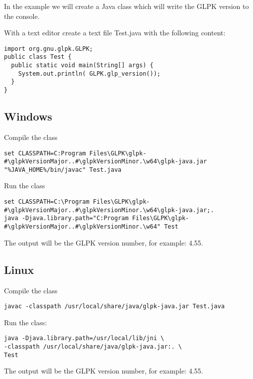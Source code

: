 \documentclass[a4paper,11pt]{report}
\newcommand{\glpkVersionMajor}{4}
\newcommand{\glpkVersionMinor}{55}
\begin{document}
In the example we will create a Java class which will write the GLPK version to the console.

With a text editor create a text file Test.java with the following content:

\begin{lstlisting}
import org.gnu.glpk.GLPK;
public class Test {
  public static void main(String[] args) {
    System.out.println( GLPK.glp_version());
  }
}
\end{lstlisting}

\subsection{Windows}

Compile the class

\begin{lstlisting}
set CLASSPATH=C:Program Files\GLPK\glpk-#\glpkVersionMajor..#\glpkVersionMinor.\w64\glpk-java.jar
"%JAVA_HOME%/bin/javac" Test.java
\end{lstlisting}

Run the class

\begin{lstlisting}
set CLASSPATH=C:\Program Files\GLPK\glpk-#\glpkVersionMajor..#\glpkVersionMinor.\w64\glpk-java.jar;.
java -Djava.library.path="C:Program Files\GLPK\glpk-#\glpkVersionMajor..#\glpkVersionMinor.\w64" Test
\end{lstlisting}

The output will be the GLPK version number, for example: \glpkVersionMajor.\glpkVersionMinor.

\subsection{Linux}
Compile the class

\begin{lstlisting}
javac -classpath /usr/local/share/java/glpk-java.jar Test.java
\end{lstlisting}

Run the class:

\begin{lstlisting}
java -Djava.library.path=/usr/local/lib/jni \
-classpath /usr/local/share/java/glpk-java.jar:. \
Test
\end{lstlisting}

The output will be the GLPK version number, for example: \glpkVersionMajor.\glpkVersionMinor.
\end{document}
